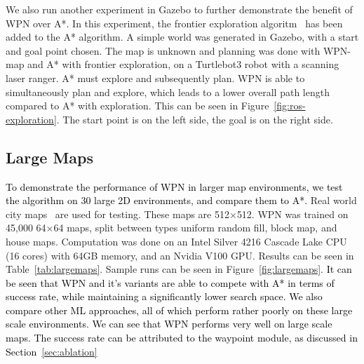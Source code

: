 \documentclass[journal, twocolumn]{IEEEtran}
\begin{document}
We also run another experiment in Gazebo to further demonstrate the benefit of WPN over A*. In this experiment, the frontier exploration algoritm~\cite{Yamauchi} has been added to the A* algorithm. A simple world was generated in Gazebo, with a start and goal point chosen. The map is unknown and planning was done with WPN-map and A* with frontier exploration, on a Turtlebot3 robot with a scanning laser ranger. A* must explore and subsequently plan. WPN is able to simultaneously plan and explore, which leads to a lower overall path length compared to A* with exploration. This can be seen in Figure~\ref{fig:ros-exploration}. The start point is on the left side, the goal is on the right side. 
\subsection{Large Maps}
\textcolor{black}{To demonstrate the performance of WPN in larger map environments, we test the algorithm on 30 large 2D environments, and compare them to A*.}
Real world city maps~\cite{sturtevant2012benchmarks} are used for testing. These maps are 512$\times$512. WPN was trained on 45,000 64$\times$64 maps, split between types uniform random fill, block map, and house maps. Computation was done on an Intel Silver 4216 Cascade Lake CPU (16 cores) with 64GB memory, and an Nvidia V100 GPU. Results can be seen in Table~\ref{tab:largemaps}. Sample runs can be seen in Figure~\ref{fig:largemaps}. \textcolor{black}{It can be seen that WPN and it's variants are able to compete with A* in terms of success rate, while maintaining a significantly lower search space. We also compare other ML approaches, all of which perform rather poorly on these large scale environments. We can see that WPN performs very well on large scale maps. The success rate can be attributed to the waypoint module, as discussed in Section~\ref{sec:ablation}}
\end{document}
